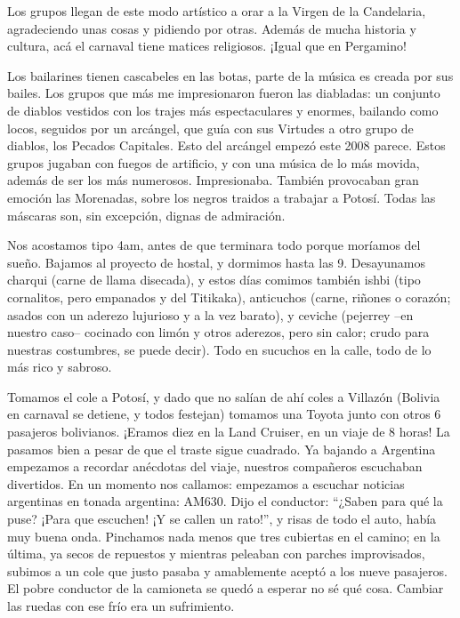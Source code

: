 Los grupos llegan de este modo artístico a orar a la Virgen de la Candelaria,
agradeciendo unas cosas y pidiendo por otras. Además de mucha historia y
cultura, acá el carnaval tiene matices religiosos. ¡Igual que en Pergamino!

Los bailarines tienen cascabeles en las botas, parte de la música es creada por
sus bailes. Los grupos que más me impresionaron fueron las diabladas: un
conjunto de diablos vestidos con los trajes más espectaculares y enormes,
bailando como locos, seguidos por un arcángel, que guía con sus Virtudes a otro
grupo de diablos, los Pecados Capitales. Esto del arcángel empezó este 2008
parece. Estos grupos jugaban con fuegos de artificio, y con una música de lo más
movida, además de ser los más numerosos. Impresionaba. También provocaban gran
emoción las Morenadas, sobre los negros traidos a trabajar a Potosí. Todas las
máscaras son, sin excepción, dignas de admiración.

Nos acostamos tipo 4am, antes de que terminara todo porque moríamos del sueño.
Bajamos al proyecto de hostal, y dormimos hasta las 9. Desayunamos charqui
(carne de llama disecada), y estos días comimos también ishbi (tipo cornalitos,
pero empanados y del Titikaka), anticuchos (carne, riñones o corazón; asados con
un aderezo lujurioso y a la vez barato), y ceviche (pejerrey --en nuestro caso--
cocinado con limón y otros aderezos, pero sin calor; crudo para nuestras
costumbres, se puede decir). Todo en sucuchos en la calle, todo de lo más rico y
sabroso.

Tomamos el cole a Potosí, y dado que no salían de ahí coles a Villazón (Bolivia
en carnaval se detiene, y todos festejan) tomamos una Toyota junto con otros 6
pasajeros bolivianos. ¡Eramos diez en la Land Cruiser, en un viaje de 8 horas!
La pasamos bien a pesar de que el traste sigue cuadrado. Ya bajando a Argentina
empezamos a recordar anécdotas del viaje, nuestros compañeros escuchaban
divertidos. En un momento nos callamos: empezamos a escuchar noticias argentinas
en tonada argentina: {\small AM}630. Dijo el conductor: ``¿Saben para qué la
puse? ¡Para que escuchen! ¡Y se callen un rato!'', y risas de todo el auto,
había muy buena onda. Pinchamos nada menos que tres cubiertas en el camino; en
la última, ya secos de repuestos y mientras peleaban con parches improvisados,
subimos a un cole que justo pasaba y amablemente aceptó a los nueve pasajeros.
El pobre conductor de la camioneta se quedó a esperar no sé qué cosa. Cambiar
las ruedas con ese frío era un sufrimiento.

